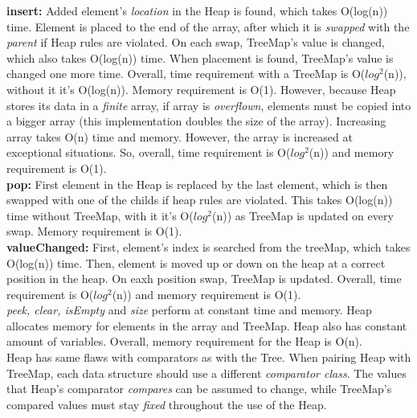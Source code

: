 \documentclass[a4paper,12pt]{article}
\begin{document}
\textbf{insert:} Added element's \emph{location} in the Heap is found, which takes O(log(n)) time. Element is placed to the end of the array, after which it is \emph{swapped} with the \emph{parent} if Heap rules are violated. On each swap, TreeMap's value is changed, which also takes O(log(n)) time. When placement is found, TreeMap's value is changed one more time. Overall, time requirement with a TreeMap is O($log^{2}$(n)), without it it's O(log(n)). Memory requirement is O(1). However, because Heap stores its data in a \emph{finite} array, if array is \emph{overflown}, elements must be copied into a bigger array (this implementation doubles the size of the array). Increasing array takes O(n) time and memory. However, the array is increased at exceptional situations. So, overall, time requirement is O($log^{2}$(n)) and memory requirement is O(1).
\\

\textbf{pop:} First element in the Heap is replaced by the last element, which is then swapped with one of the childs if heap rules are violated. This takes O(log(n)) time without TreeMap, with it it's O($log^{2}$(n)) as TreeMap is updated on every swap. Memory requirement is O(1).
\\

\textbf{valueChanged:} First, element's index is searched from the treeMap, which takes O(log(n)) time. Then, element is moved up or down on the heap at a correct position in the heap. On eaxh position swap, TreeMap is updated. Overall, time requirement is O($log^{2}$(n)) and memory requirement is O(1).
\\

\emph{peek, clear, isEmpty} and \emph{size} perform at constant time and memory. Heap allocates memory for elements in the array and TreeMap. Heap also has constant amount of variables. Overall, memory requirement for the Heap is O(n).\\
Heap has same flaws with comparators as with the Tree. When pairing Heap with TreeMap, each data structure should use a different \emph{comparator class}. The values that Heap's comparator \emph{compares} can be assumed to change, while TreeMap's compared values must stay \emph{fixed} throughout the use of the Heap. 
\end{document}
